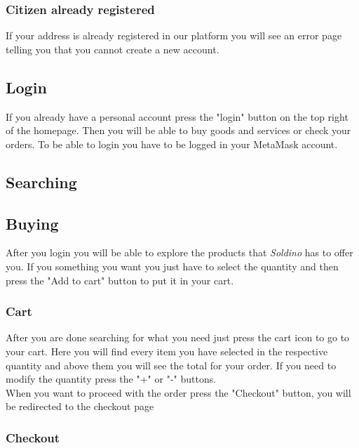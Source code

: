 	\subsubsection{Citizen already registered}
	If your address is already registered in our platform you will see an
	error page telling you that you cannot create a new account.
	\subsection{Login}
	If you already have a personal account press the "login" button on the 
	top right of the homepage. Then you will be able to buy goods and services 
	or check your orders. To be able to login you have to be logged in your 
	MetaMask account.
	\subsection{Searching}
	\subsection{Buying}
	After you login you will be able to explore the products that 
	\textit{Soldino} has to offer you. If you something you want you
	just have to select the quantity and then press the "Add to cart" button 
	to put it in your cart.
	\subsubsection{Cart}
	After you are done searching for what you need just press the cart icon to
	go to your cart. Here you will find every item you have selected in the 
	respective quantity and above them you will see the total for your order.
	If you need to modify the quantity press the "+" or "-" buttons. \\
	When you want to proceed with the order press the "Checkout" button, 
	you will be redirected to the checkout page
	\subsubsection{Checkout}
